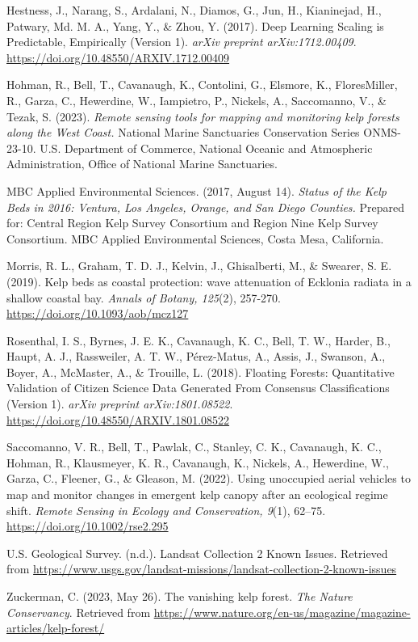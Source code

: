 \documentclass{article}
\begin{document}
\begin{thebibliography}{99}
Hestness, J., Narang, S., Ardalani, N., Diamos, G., Jun, H., Kianinejad, H., Patwary, Md. M. A., Yang, Y., \& Zhou, Y. (2017).
Deep Learning Scaling is Predictable, Empirically (Version 1).
\textit{arXiv preprint arXiv:1712.00409}.
\url{https://doi.org/10.48550/ARXIV.1712.00409}

Hohman, R., Bell, T., Cavanaugh, K., Contolini, G., Elsmore, K., FloresMiller, R., Garza, C., Hewerdine, W., Iampietro, P., Nickels, A., Saccomanno, V., \& Tezak, S. (2023).
\textit{Remote sensing tools for mapping and monitoring kelp forests along the West Coast.}
National Marine Sanctuaries Conservation Series ONMS-23-10. U.S. Department of Commerce, National Oceanic and Atmospheric Administration, Office of National Marine Sanctuaries.

MBC Applied Environmental Sciences. (2017, August 14).
\textit{Status of the Kelp Beds in 2016: Ventura, Los Angeles, Orange, and San Diego Counties.}
Prepared for: Central Region Kelp Survey Consortium and Region Nine Kelp Survey Consortium. MBC Applied Environmental Sciences, Costa Mesa, California.

Morris, R. L., Graham, T. D. J., Kelvin, J., Ghisalberti, M., \& Swearer, S. E. (2019).
Kelp beds as coastal protection: wave attenuation of Ecklonia radiata in a shallow coastal bay.
\textit{Annals of Botany, 125}(2), 257-270. %
\url{https://doi.org/10.1093/aob/mcz127}

Rosenthal, I. S., Byrnes, J. E. K., Cavanaugh, K. C., Bell, T. W., Harder, B., Haupt, A. J., Rassweiler, A. T. W., Pérez-Matus, A., Assis, J., Swanson, A., Boyer, A., McMaster, A., \& Trouille, L. (2018).
Floating Forests: Quantitative Validation of Citizen Science Data Generated From Consensus Classifications (Version 1).
\textit{arXiv preprint arXiv:1801.08522}.
\url{https://doi.org/10.48550/ARXIV.1801.08522}

Saccomanno, V. R., Bell, T., Pawlak, C., Stanley, C. K., Cavanaugh, K. C., Hohman, R., Klausmeyer, K. R., Cavanaugh, K., Nickels, A., Hewerdine, W., Garza, C., Fleener, G., \& Gleason, M. (2022).
Using unoccupied aerial vehicles to map and monitor changes in emergent kelp canopy after an ecological regime shift.
\textit{Remote Sensing in Ecology and Conservation, 9}(1), 62--75.
\url{https://doi.org/10.1002/rse2.295}

U.S. Geological Survey. (n.d.).
Landsat Collection 2 Known Issues.
Retrieved from \url{https://www.usgs.gov/landsat-missions/landsat-collection-2-known-issues}

Zuckerman, C. (2023, May 26).
The vanishing kelp forest.
\textit{The Nature Conservancy}.
Retrieved from \url{https://www.nature.org/en-us/magazine/magazine-articles/kelp-forest/}

\end{thebibliography}
\endgroup %
\end{document}

